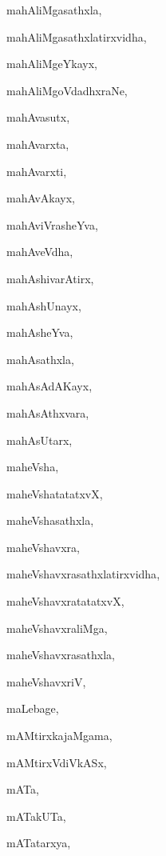 \begin{multicols}{2}
{mahAliMgasathxla}, \pageref{mahAliMgasathxla}

{mahAliMgasathxlatirxvidha}, \pageref{mahAliMgasathxlatirxvidha}

{mahAliMgeYkayx}, \pageref{mahAliMgeYkayx}

{mahAliMgoVdadhxraNe}, \pageref{mahAliMgoVdadhxraNe}

{mahAvasutx}, \pageref{mahAvasutx}

{mahAvarxta}, \pageref{mahAvarxta}

{mahAvarxti}, \pageref{mahAvarxti}

{mahAvAkayx}, \pageref{mahAvAkayx}

{mahAviVrasheYva}, \pageref{mahAviVrasheYva}

{mahAveVdha}, \pageref{mahAveVdha}

{mahAshivarAtirx}, \pageref{mahAshivarAtirx}

{mahAshUnayx}, \pageref{mahAshUnayx}

{mahAsheYva}, \pageref{mahAsheYva}

{mahAsathxla}, \pageref{mahAsathxla}

{mahAsAdAKayx}, \pageref{mahAsAdAKayx}

{mahAsAthxvara}, \pageref{mahAsAthxvara}

{mahAsUtarx}, \pageref{mahAsUtarx}

{maheVsha}, \pageref{maheVsha}

{maheVshatatatxvX}, \pageref{maheVshatatatxvX}

{maheVshasathxla}, \pageref{maheVshasathxla}

{maheVshavxra}, \pageref{maheVshavxra}

{maheVshavxrasathxlatirxvidha}, \pageref{maheVshavxrasathxlatirxvidha}

{maheVshavxratatatxvX}, \pageref{maheVshavxratatatxvX}

{maheVshavxraliMga}, \pageref{maheVshavxraliMga}

{maheVshavxrasathxla}, \pageref{maheVshavxrasathxla}

{maheVshavxriV}, \pageref{maheVshavxriV}

{maLebage}, \pageref{maLebage}

{mAMtirxkajaMgama}, \pageref{mAMtirxkajaMgama}

{mAMtirxVdiVkASx}, \pageref{mAMtirxVdiVkASx}

{mATa}, \pageref{mATa}

{mATakUTa}, \pageref{mATakUTa}

{mATatarxya}, \pageref{mATatarxya}


\end{multicols}
